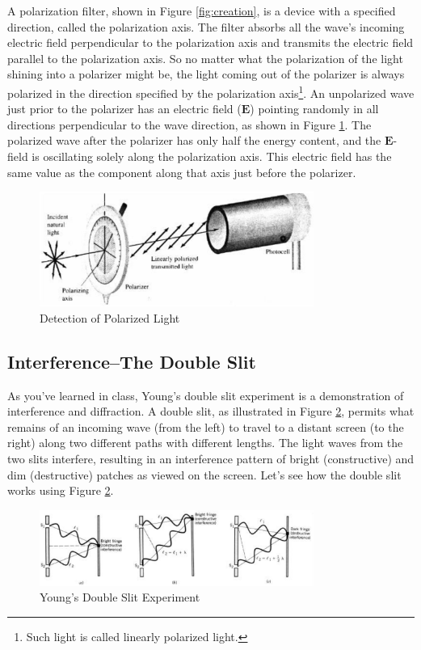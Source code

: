 A polarization filter, shown in Figure {\ref{fig:creation}}, is a device with a specified direction, called the polarization axis. The filter absorbs all the wave's incoming electric field perpendicular to the polarization axis and transmits the electric field parallel to the polarization axis. So no matter what the polarization of the light shining into a polarizer might be, the light coming out of the polarizer is always polarized in the direction specified by the polarization axis\footnote{Such light is called linearly polarized light.}. An unpolarized wave just prior to the polarizer has an electric field ($\mathbf{E}$) pointing randomly in all directions perpendicular to the wave direction, as shown in Figure {\ref{fig:detection}}. The polarized wave after the polarizer has only half the energy content, and the $\mathbf{E}$-field is oscillating solely along the polarization axis. This electric field has the same value as the component along that axis just before the polarizer.
\begin{figure}[h]
\centering
\includegraphics[width=0.8\textwidth]{./Exp8/pic/image2.png}
\caption{Detection of Polarized Light}
\label{fig:detection}
\end{figure}

\subsection{Interference--The Double Slit}
As you've learned in class, Young's double slit experiment is a demonstration of interference and diffraction. A double slit, as illustrated in Figure {\ref{fig:double}}, permits what remains of an incoming wave (from the left) to travel to a distant screen (to the right) along two different paths with different lengths. The light waves from the two slits interfere, resulting in an interference pattern of bright (constructive) and dim (destructive) patches as viewed on the screen. Let's see how the double slit works using Figure {\ref{fig:double}}.
\begin{figure}[h]
\centering
\includegraphics[width=0.8\textwidth]{./Exp8/pic/image3.png}
\caption{Young's Double Slit Experiment}
\label{fig:double}
\end{figure}

